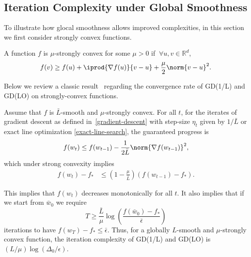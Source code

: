 \documentclass[10pt]{article} %
\begin{document}

\subsection{Iteration Complexity under Global Smoothness}

To illustrate how glocal smoothness allows improved complexities, in this section
we first consider strongly convex functions.
\begin{definition}
    \label{strong convexity}
    A function $f$ is $\mu$-strongly convex for some $\mu > 0$ if $\ \forall u, v \in \mathbb{R}^d$,
    \begin{equation*}
        f(v) \geq f(u) + \iprod{\nabla f(u)}{v - u} + \frac{\mu}{2}\norm{v - u}^2.
    \end{equation*}
\end{definition}
Below we review a classic result~\cite[Chapter~9]{boyd2004} regarding the convergence rate of GD(1/L) and GD(LO) on strongly-convex functions.
\begin{lemma}
\label{lem:GD}
Assume that $f$ is $\bar{L}$-smooth and $\mu$-strongly convex. For all $t$, for the iterates of gradient descent as defined in~\eqref{gradient-descent} with step-size $\eta_t$ given by $1/\bar{L}$ or exact line optimization \eqref{exact-line-search}, the guaranteed progress is
    \begin{equation}
        f(w_{t})
        \leq f(w_{t-1}) - \frac{1}{2\bar{L}}\norm{\nabla f(w_{t-1})}^2,
        \label{eq:GD-progress}
    \end{equation}
    which under strong convexity implies
    \begin{align*}
        f(w_{t}) - f_*
        &\leq \left(1 - \frac{\mu}{\bar{L}}\right)(f(w_{t-1}) - f_*).
    \end{align*}
\end{lemma}
This implies that $f(w_{t})$ decreases monotonically for all $t$. It also implies that if we start from $\bar{w}_0$ we require 
\begin{equation}
\label{eq:GDic}
T \geq \frac{\bar{L}}{\mu}\log\left(\frac{f(\bar{w}_0) - f_*}{\bar{\epsilon}}\right)
\end{equation}
iterations to have $f(w_{T}) - f_{*} \leq \bar{\epsilon}$. Thus, for a globally $L$-smooth and $\mu$-strongly convex function, the iteration complexity of GD(1/L) and GD(LO) is $(L/\mu)\log(\Delta_{0}/\epsilon)$.
\end{document}
